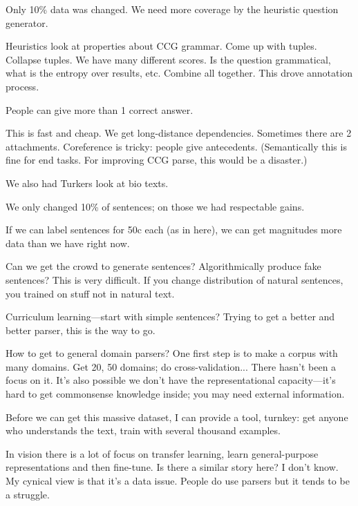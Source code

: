 Only 10\% data was changed.  We need more coverage by the heuristic question generator.

Heuristics look at properties about CCG grammar. Come up with tuples. Collapse tuples. We have many different scores. Is the question grammatical, what is the entropy over results, etc. Combine all together. This drove annotation process.

People can give more than 1 correct answer.

This is fast and cheap. %
We get long-distance dependencies. 
Sometimes there are 2 attachments.
Coreference is tricky: people give antecedents. (Semantically this is fine for end tasks. For improving CCG parse, this would be a disaster.)


We also had Turkers look at bio texts.

We only changed 10\% of sentences; on those we had respectable gains.

If we can label sentences for 50c each (as in here), we can get magnitudes more data than we have right now.

Can we get the crowd to generate sentences? 
Algorithmically produce fake sentences? This is very difficult. If you change distribution of natural sentences, you trained on stuff not in natural text.


Curriculum learning---start with simple sentences?  Trying to get a better and better parser, this is the way to go.

How to get to general domain parsers?  One first step is to make a corpus with many domains. Get 20, 50 domains; do cross-validation... There hasn't been a focus on it. It's also possible we don't have the representational capacity---it's hard to get commonsense knowledge inside; you may need external information.

Before we can get this massive dataset, I can provide a tool, turnkey: get anyone who understands the text, train with several thousand examples.

In vision there is a lot of focus on transfer learning, learn general-purpose representations and then fine-tune. Is there a similar story here? I don't know. My cynical view is that it's a data issue. People do use parsers but it tends to be a struggle.





